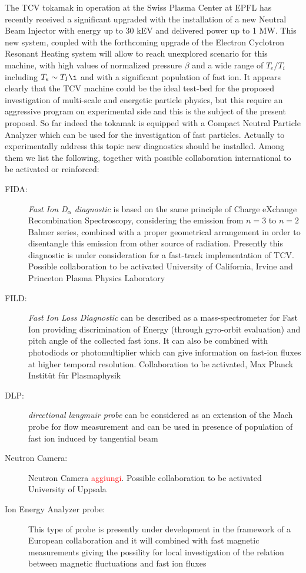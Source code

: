 \documentclass[12pt,a4paper]{article}
\begin{document}
The TCV tokamak in operation at the Swiss Plasma Center at EPFL has 
recently received a significant upgraded with the installation of a new Neutral Beam
Injector with energy up to 30 kEV and delivered power up to 1 MW. This
new system, coupled with the forthcoming upgrade of the Electron
Cyclotron Resonant Heating system will allow to reach unexplored
scenario for this machine, with high values of normalized pressure $\beta$ and a wide range of
$T_e/T_i$ including $T_e\sim T_I\i$ and with a significant population
of fast ion. It appears clearly that the TCV machine could be the
ideal test-bed for the proposed investigation of multi-scale and
energetic particle physics, but this require an aggressive program on
experimental side and this is the subject of the present proposal. 
So far indeed the tokamak is equipped with a
Compact Neutral Particle Analyzer which can be used for the
investigation of fast particles. Actually to experimentally address
this topic new diagnostics should be installed. Among them we list the
following, together with possible collaboration international to be activated or reinforced:
\begin{description}
\item[FIDA:] \emph{Fast Ion D$_{\alpha}$ diagnostic} is based on the
  same principle of Charge eXchange Recombination Spectroscopy,
  considering the emission from $n=3$ to $n=2$ Balmer series, combined
  with a proper geometrical arrangement in order to disentangle this
  emission from other source of radiation. Presently this diagnostic
  is under consideration for a fast-track implementation of
  TCV. Possible collaboration to be activated University of
  California, Irvine and Princeton Plasma Physics Laboratory
\item[FILD:] \emph{Fast Ion Loss Diagnostic} can be described as a
  mass-spectrometer for Fast Ion providing discrimination of Energy
  (through gyro-orbit evaluation) and pitch angle of the collected
  fast ions. It can also be combined with photodiods or
  photomultiplier which can give information on fast-ion fluxes at
  higher temporal resolution. Collaboration to be activated, Max
  Planck Instit{\"u}t f{\"u}r Plasmaphysik
\item[DLP:] \emph{directional langmuir probe} can be considered as an
  extension of the Mach probe for flow measurement and can be used in
  presence of population of fast ion induced by tangential beam
\item[Neutron Camera:] Neutron Camera
  \textcolor{red}{aggiungi}. Possible collaboration to be activated
  University of Uppsala
\item[Ion Energy Analyzer probe:] This type of probe is presently
  under development in the framework of a European collaboration and
  it will combined with fast magnetic measurements giving the
  possility for local investigation of the relation between magnetic
  fluctuations and fast ion fluxes
\end{description}
\end{document}

